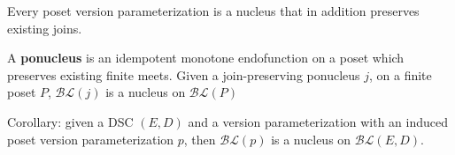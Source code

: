 \documentclass{beamer}
\newcommand{\BLc}{\mathcal{BL}}
\begin{document}
\begin{frame}
\begin{lemma}
Every poset version parameterization is a nucleus that in addition preserves existing joins.
\end{lemma}

\begin{theorem}
A \textbf{ponucleus} is an idempotent monotone endofunction on a poset which preserves existing finite meets.
Given a join-preserving ponucleus \(j\), on a finite poset \(P\),  \(\BLc(j)\) is a nucleus on \(\BLc(P)\)
\end{theorem}

Corollary: given a DSC \((E,D)\) and a version parameterization with an induced poset version parameterization \(p\), then \(\BLc(p)\) is a nucleus on \(\BLc(E,D)\).
\end{frame}
\end{document}
